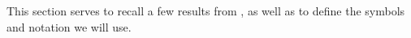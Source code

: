 \documentclass[../main-v2-manifolds.tex]{subfiles}
\begin{document}
\newpage

This section serves to recall a few results from \cite{Brezis2010Functional,Folland2013Real,Roman2007Advanced,Lee2013Introduction,Lee2019Introduction}, as well as to define the symbols and notation we will use. 
\end{document}
